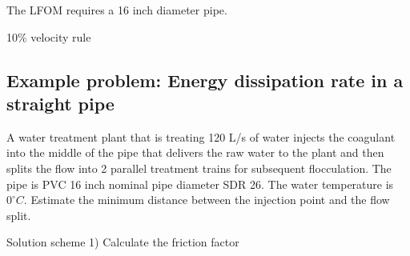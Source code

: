 \documentclass[letterpaper,10pt,english]{sphinxmanual}
\begin{document}
The LFOM requires a 16 inch diameter pipe.

10\% velocity rule

%
\begin{sphinxVerbatim}[commandchars=\\\{\}]
  
  
\end{sphinxVerbatim}


\subsection{Example problem: Energy dissipation rate in a straight pipe}
\label{\detokenize{Rapid_Mix/RM_Design:example-problem-energy-dissipation-rate-in-a-straight-pipe}}
A water treatment plant that is treating 120 L/s of water injects the coagulant into the middle of the pipe that delivers the raw water to the plant and then splits the flow into 2 parallel treatment trains for subsequent flocculation. The pipe is PVC 16 inch nominal pipe diameter SDR 26. The water temperature is \(0^{\circ}C\). Estimate the minimum distance between the injection point and the flow split.

Solution scheme 1) Calculate the friction factor
\end{document}
